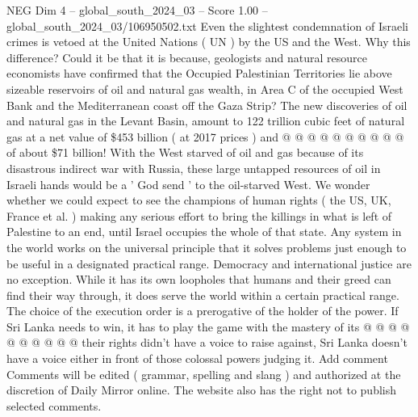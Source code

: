 \begin{textsample}{NEG Dim 4 – global\_south\_2024\_03 – Score 1.00 – global\_south\_2024\_03/106950502.txt}
Even the slightest condemnation of Israeli crimes is vetoed at the United Nations ( UN ) by the US and the West.
Why this difference?
Could it be that it is because, geologists and natural resource economists have confirmed that the Occupied Palestinian Territories lie above sizeable reservoirs of oil and natural gas wealth, in Area C of the occupied West Bank and the Mediterranean coast off the Gaza Strip?
The new discoveries of oil and natural gas in the Levant Basin, amount to 122 trillion cubic feet of natural gas at a net value of \$453 billion ( at 2017 prices ) and @ @ @ @ @ @ @ @ @ @ of about \$71 billion!
With the West starved of oil and gas because of its disastrous indirect war with Russia, these large untapped resources of oil in Israeli hands would be a ' God send ' to the oil-starved West.
We wonder whether we could expect to see the champions of human rights ( the US, UK, France et al. ) making any serious effort to bring the killings in what is left of Palestine to an end, until Israel occupies the whole of that state.
Any system in the world works on the universal principle that it solves problems just enough to be useful in a designated practical range.
Democracy and international justice are no exception.
While it has its own loopholes that humans and their greed can find their way through, it does serve the world within a certain practical range.
The choice of the execution order is a prerogative of the holder of the power.
If Sri Lanka needs to win, it has to play the game with the mastery of its @ @ @ @ @ @ @ @ @ @ their rights didn't have a voice to raise against, Sri Lanka doesn't have a voice either in front of those colossal powers judging it.
Add comment Comments will be edited ( grammar, spelling and slang ) and authorized at the discretion of Daily Mirror online.
The website also has the right not to publish selected comments.

\end{textsample}
